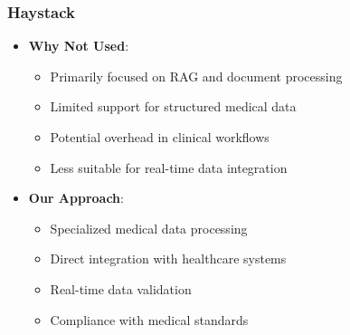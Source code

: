 \documentclass[12pt]{article}
\begin{document}
\subsubsection{Haystack}
\begin{itemize}
    \item \textbf{Why Not Used}:
    \begin{itemize}
        \item Primarily focused on RAG and document processing
        \item Limited support for structured medical data
        \item Potential overhead in clinical workflows
        \item Less suitable for real-time data integration
    \end{itemize}
    \item \textbf{Our Approach}:
    \begin{itemize}
        \item Specialized medical data processing
        \item Direct integration with healthcare systems
        \item Real-time data validation
        \item Compliance with medical standards
    \end{itemize}
\end{itemize}
\end{document}
